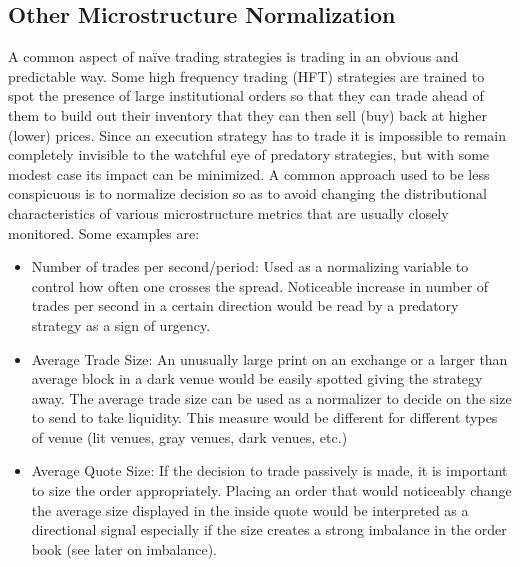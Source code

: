 \subsection{Other Microstructure Normalization}

A common aspect of na\"ive trading strategies is trading in an obvious and predictable way. Some high frequency trading (HFT) strategies are trained to spot the presence of large institutional orders so that they can trade ahead of them to build out their inventory that they can then sell (buy) back at higher (lower) prices. Since an execution strategy has to trade it is impossible to remain completely invisible to the watchful eye of predatory strategies, but with some modest case its impact can be minimized. A common approach used to be less conspicuous is to normalize decision so as to avoid changing the distributional characteristics of various microstructure metrics that are usually closely monitored. Some examples are:
        \begin{itemize}
        	\item Number of trades per second/period: Used as a normalizing variable to control how often one crosses the spread. Noticeable increase in number of trades per second in a certain direction would be read by a predatory strategy as a sign of urgency.
        	\item Average Trade Size: An unusually large print on an exchange or a larger than average block in a dark venue would be easily spotted giving the strategy away. The average trade size can be used as a normalizer to decide on the size to send to take liquidity.  This measure would be different for different types of venue (lit venues, gray venues, dark venues, etc.)
        	\item Average Quote Size: If the decision to trade passively is made, it is important to size the order appropriately. Placing an order that would noticeably change the average size displayed in the inside quote would be interpreted as a directional signal especially if the size creates a strong imbalance in the order book (see later on imbalance).
        \end{itemize}


